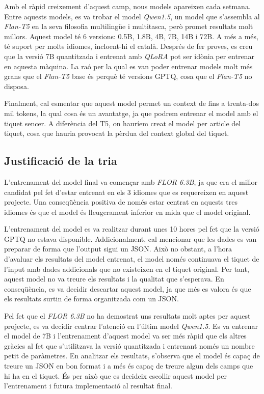 Amb el ràpid creixement d'aquest camp, nous models apareixen cada setmana. Entre aquests models, es va trobar el model \textit{Qwen1.5}, un model que s'assembla al \textit{Flan-T5} en la seva filosofia multilingüe i multitasca, però promet resultats molt millors. Aquest model té 6 versions: 0.5B, 1.8B, 4B, 7B, 14B i 72B. A més a més, té suport per molts idiomes, incloent-hi el català. Després de fer proves, es creu que la versió 7B quantitzada i entrenat amb \textit{QLoRA} pot ser idònia per entrenar en aquesta màquina. La raó per la qual es van poder entrenar models molt més grans que el \textit{Flan-T5} base és perquè té versions GPTQ, cosa que el \textit{Flan-T5} no disposa.

Finalment, cal esmentar que aquest model permet un context de fins a trenta-dos mil tokens, la qual cosa és un avantatge, ja que podrem entrenar el model amb el tiquet sencer. A diferència del T5, on hauríem creat el model per article del tiquet, cosa que hauria provocat la pèrdua del context global del tiquet.

\subsection{Justificació de la tria}

L'entrenament del model final va començar amb \textit{FLOR 6.3B}, ja que era el millor candidat pel fet d'estar entrenat en els 3 idiomes que es requereixen en aquest projecte. Una conseqüència positiva de només estar centrat en aquests tres idiomes és que el model és lleugerament inferior en mida que el model original.

L'entrenament del model es va realitzar durant unes 10 hores pel fet que la versió GPTQ no estava disponible. Addicionalment, cal mencionar que les dades es van preparar de forma que l'output sigui un JSON. Això no obstant, a l'hora d'avaluar els resultats del model entrenat, el model només continuava el tiquet de l'input amb dades addicionals que no existeixen en el tiquet original. Per tant, aquest model no va treure els resultats i la qualitat que s'esperava. En conseqüència, es va decidir descartar aquest model, ja que més es valora és que els resultats surtin de forma organitzada com un JSON.

Pel fet que el \textit{FLOR 6.3B} no ha demostrat uns resultats molt aptes per aquest projecte, es va decidir centrar l'atenció en l'últim model \textit{Qwen1.5}. Es va entrenar el model de 7B i l'entrenament d'aquest model va ser més ràpid que els altres gràcies al fet que s'utilitzava la versió quantitzada i entrenant només un nombre petit de paràmetres. En analitzar els resultats, s'observa que el model és capaç de treure un JSON en bon format i a més és capaç de treure algun dels camps que hi ha en el tiquet. És per això que es decideix escollir aquest model per l'entrenament i futura implementació al resultat final.

